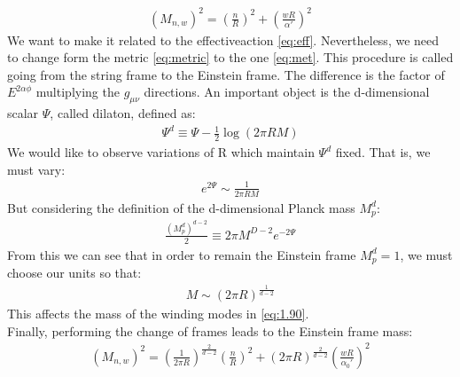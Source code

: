 \begin{align}
    \label{eq:1.90}
    (M_{n,w})^{2} = (\frac{n}{R})^{2} + (\frac{wR}{\alpha'})^{2}
\end{align}
We want to make it related to the effectiveaction \ref{eq:eff}. Nevertheless, we need to change form the metric \ref{eq:metric} to the one \ref{eq:met}. This procedure is called going from the string frame to the Einstein frame. The difference is the factor of $E^{2\alpha\phi}$ multiplying the $g_{\mu\nu}$ directions. An important object is the d-dimensional scalar $\Psi$, called dilaton, defined as:
\begin{align}
    \Psi^{d} \equiv \Psi - \frac{1}{2} \log (2\pi R M)
\end{align}
We would like to observe variations of R which maintain $\Psi ^{d}$ fixed. That is, we must vary:
\begin{align}
    e^{2\Psi} \sim \frac{1}{2\pi R M}
\end{align}
But considering the definition of the d-dimensional Planck mass $M_{p}^{d}$:
\begin{align}
    \frac{(M_{p}^{d})^{d-2}}{2} \equiv 2\pi M^{D-2} e^{-2\Psi}
\end{align}
From this we can see that in order to remain the Einstein frame $M_{p} ^{d} = 1$, we must choose our units so that:
\begin{align}
    M \sim (2\pi R) ^{\frac{1}{d-2}}
\end{align}
This affects the mass of the winding modes in \ref{eq:1.90}. \\
\indent Finally, performing the change of frames leads to the Einstein frame mass:
\begin{align}
    \label{eq:efram}
    (M_{n,w})^{2} = (\frac{1}{2\pi R})^{\frac{2}{d-2}} (\frac{n}{R})^{2} + (2\pi R)^{\frac{2}{d-2}} (\frac{wR}{\alpha_{0}'})^{2}
\end{align}

